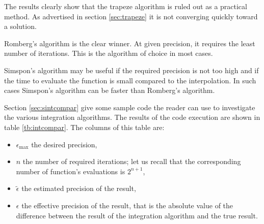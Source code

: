 The results clearly show that the trapeze algorithm is ruled out
as a practical method. As advertised in section \ref{sec:trapeze}
it is not converging quickly toward a solution.

Romberg's algorithm is the clear winner. At given precision, it
requires the least number of iterations. This is the algorithm of
choice in most cases.

Simspon's algorithm may be useful if the required precision is not
too high and if the time to evaluate the function is small
compared to the interpolation. In such cases Simspon's algorithm
can be faster than Romberg's algorithm.

Section \ref{sec:sintcompar} give some sample code the reader can use to
investigate the various integration algorithms.
The results of the code execution are shown in table \ref{tb:intcompar}.
The columns of this table are:
\begin{itemize}
\item $\epsilon_{\mathop{\textrm{max}}}$ the desired precision,\\
\item $n$ the number of required iterations; let us recall that the
corresponding number of function's evaluations is $2^{n+1}$,\\
\item $\tilde{\epsilon}$ the estimated precision of the result,\\
\item $\epsilon$ the effective precision of the result, that is the absolute value
of the difference between the result of the integration algorithm and the true result.\\
\end{itemize}

